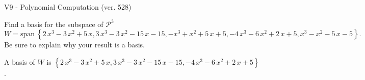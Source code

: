 \begin{exercise}
  \begin{exerciseTitle}V9 - Polynomial Computation (ver. 528)\end{exerciseTitle}
  \begin{exerciseStatement}
    Find a basis for the subspace of \(\mathcal{P}^3\) 
\[W=\mathrm{span}\ \left\{2 \, x^{3} - 3 \, x^{2} + 5 \, x , 3 \, x^{3} - 3 \, x^{2} - 15 \, x - 15 , -x^{3} + x^{2} + 5 \, x + 5 , -4 \, x^{3} - 6 \, x^{2} + 2 \, x + 5 , x^{3} - x^{2} - 5 \, x - 5\right\}.\]
 Be sure to explain why your result is a basis.


  \end{exerciseStatement}
  \begin{exerciseAnswer}
   A basis of \(W\) is  \(\left\{2 \, x^{3} - 3 \, x^{2} + 5 \, x , 3 \, x^{3} - 3 \, x^{2} - 15 \, x - 15 , -4 \, x^{3} - 6 \, x^{2} + 2 \, x + 5\right\}\).
  


  \end{exerciseAnswer}
\end{exercise}